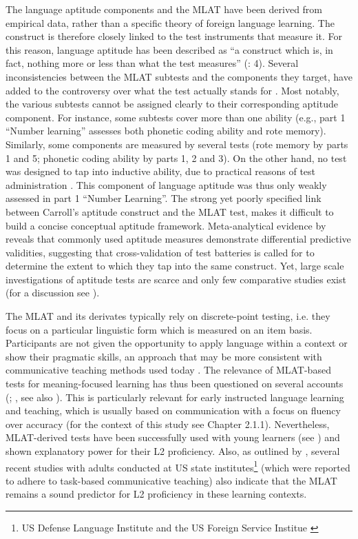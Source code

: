 \documentclass[output=paper]{langscibook}
\begin{document}
The language aptitude components and the MLAT have been derived from empirical data, rather than a specific theory of foreign language learning. The construct is therefore closely linked to the test instruments that measure it. For this reason, language aptitude has been described as “a construct which is, in fact, nothing more or less than what the test measures” (\citealt{SafarKormos2008}: 4). Several inconsistencies between the MLAT subtests and the components they target, have added to the controversy over what the test actually stands for \citep{Carpenter2008}. Most notably, the various subtests cannot be assigned clearly to their corresponding aptitude component. For instance, some subtests cover more than one ability (e.g., part 1 “Number learning” assesses both phonetic coding ability and rote memory). Similarly, some components are measured by several tests (rote memory by parts 1 and 5; phonetic coding ability by parts 1, 2 and 3). On the other hand, no test was designed to tap into inductive ability, due to practical reasons of test administration \citep{Carpenter2008}. This component of language aptitude was thus only weakly assessed in part 1 “Number Learning”. The strong yet poorly specified link between Carroll’s aptitude construct and the MLAT test, makes it difficult to build a concise conceptual aptitude framework. Meta-analytical evidence by \citet{Li2016} reveals that commonly used aptitude measures demonstrate differential predictive validities, suggesting that cross-validation of test batteries is called for to determine the extent to which they tap into the same construct. Yet, large scale investigations of aptitude tests are scarce and only few comparative studies exist (for a discussion see \citealt{StansfieldReed2019}). 

The MLAT and its derivates typically rely on discrete-point testing, i.e. they focus on a particular linguistic form which is measured on an item basis. Participants are not given the opportunity to apply language within a context or show their pragmatic skills, an approach that may be more consistent with communicative teaching methods used today \citep{Singleton2017}. The relevance of MLAT-based tests for meaning-focused learning has thus been questioned on several accounts (\citealt{Krashen1981}; \citealt{Stansfield1989}, see also \citealt{Singleton2017}). This is particularly relevant for early instructed language learning and teaching, which is usually based on communication with a focus on fluency over accuracy (for the context of this study see Chapter 2.1.1). Nevertheless, MLAT-derived tests have been successfully used with young learners (see ) and shown explanatory power for their L2 proficiency. Also, as outlined by \citet{StansfieldReed2019}, several recent studies with adults conducted at US state institutes\footnote{US Defense Language Institute \citep{Winke2013} and the US Foreign Service Institue \citep{Ehrman1998}} (which were reported to adhere to task-based communicative teaching) also indicate that the MLAT remains a sound predictor for L2 proficiency in these learning contexts. 
\end{document}
